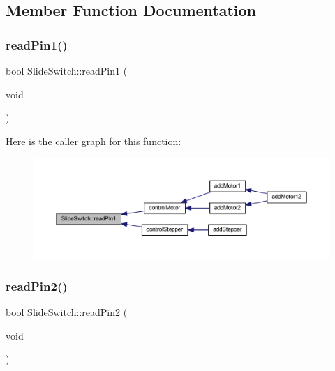 \subsection{Member Function Documentation}
\mbox{\label{class_slide_switch_a5c9f61ec4369f17e176d948ad74fc3ab}} 
\subsubsection{\texorpdfstring{read\+Pin1()}{readPin1()}}
{\footnotesize\ttfamily bool Slide\+Switch\+::read\+Pin1 (\begin{DoxyParamCaption}\item[{void}]{ }\end{DoxyParamCaption})}

Here is the caller graph for this function\+:\nopagebreak
\begin{figure}[H]
\begin{center}
\leavevmode
\includegraphics[width=350pt]{class_slide_switch_a5c9f61ec4369f17e176d948ad74fc3ab_icgraph}
\end{center}
\end{figure}
\mbox{\label{class_slide_switch_ada186df3375d7dcd7dac6470c9832830}} 
\subsubsection{\texorpdfstring{read\+Pin2()}{readPin2()}}
{\footnotesize\ttfamily bool Slide\+Switch\+::read\+Pin2 (\begin{DoxyParamCaption}\item[{void}]{ }\end{DoxyParamCaption})}

